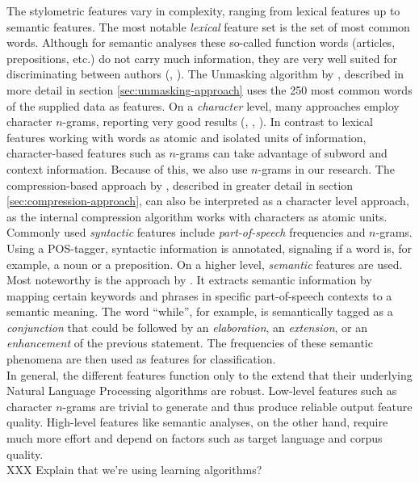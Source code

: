 The stylometric features vary in complexity, ranging from lexical features up to semantic features.
The most notable \textit{lexical} feature set is the set of most common words.
Although for semantic analyses these so-called function words (articles, prepositions, etc.) do not carry much information, they are very well suited for discriminating between authors (\cite{argamon2005measuring}, \cite{burrows1987word}).
The Unmasking algorithm by \cite{koppel2004unmasking}, described in more detail in section \ref{sec:unmasking-approach} uses the 250 most common words of the supplied data as features.
On a \textit{character} level, many approaches employ character $n$-grams, reporting very good results (\cite{peng2003language}, \cite{kevselj2003n}, \cite{stamatatos2006ensemble}).
In contrast to lexical features working with words as atomic and isolated units of information, character-based features such as $n$-grams can take advantage of subword and context information.
Because of this, we also use $n$-grams in our research.
The compression-based approach by \cite{teahan2003compression}, described in greater detail in section \ref{sec:compression-approach}, can also be interpreted as a character level approach, as the internal compression algorithm works with characters as atomic units.
Commonly used \textit{syntactic} features include \textit{part-of-speech} frequencies and $n$-grams.
Using a POS-tagger, syntactic information is annotated, signaling if a word is, for example, a noun or a preposition.
On a higher level, \textit{semantic} features are used.
Most noteworthy is the approach by \cite{argamon2007stylistic}.
It extracts semantic information by mapping certain keywords and phrases in specific part-of-speech contexts to a semantic meaning.
The word ``while'', for example, is semantically tagged as a \textit{conjunction} that could be followed by an \textit{elaboration}, an \textit{extension}, or an \textit{enhancement} of the previous statement.
The frequencies of these semantic phenomena are then used as features for classification.\\
In general, the different features function only to the extend that their underlying Natural Language Processing algorithms are robust.
Low-level features such as character $n$-grams are trivial to generate and thus produce reliable output feature quality.
High-level features like semantic analyses, on the other hand, require much more effort and depend on factors such as target language and corpus quality.\\
XXX Explain that we're using learning algorithms?
